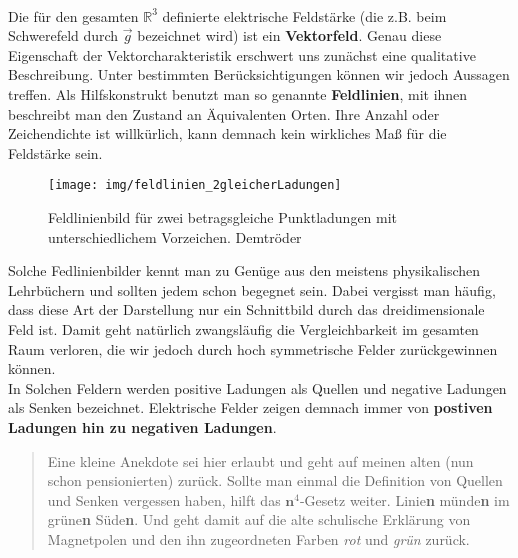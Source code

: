 \paragraph{} Die für den gesamten $\mathds{R}^3$ definierte elektrische Feldstärke (die z.B. beim Schwerefeld durch $\vec{g}$ bezeichnet wird) ist ein \textbf{Vektorfeld}. Genau diese Eigenschaft der Vektorcharakteristik erschwert uns zunächst eine qualitative Beschreibung. Unter bestimmten Berücksichtigungen können wir jedoch Aussagen treffen. Als Hilfskonstrukt benutzt man so genannte \textbf{Feldlinien}, mit ihnen beschreibt man den Zustand an Äquivalenten Orten. Ihre Anzahl oder Zeichendichte ist willkürlich, kann demnach kein wirkliches Maß für die Feldstärke sein.
\begin{figure}[h]
\texttt{[image: img/feldlinien\_2gleicherLadungen]}
\caption{Feldlinienbild für zwei betragsgleiche Punktladungen mit unterschiedlichem Vorzeichen. Demtröder}
\label{pic:Fedlinien-2gegenpolig}
\end{figure}
Solche Fedlinienbilder kennt man zu Genüge aus den meistens physikalischen Lehrbüchern und sollten jedem schon begegnet sein. Dabei vergisst man häufig, dass diese Art der Darstellung nur ein Schnittbild durch das dreidimensionale Feld ist. Damit geht natürlich zwangsläufig die Vergleichbarkeit im gesamten Raum verloren, die wir jedoch durch hoch symmetrische Felder zurückgewinnen können.\\ In Solchen Feldern werden positive Ladungen als Quellen und negative Ladungen als Senken bezeichnet. Elektrische Felder zeigen demnach immer von \textbf{postiven Ladungen hin zu negativen Ladungen}. \begin{quotation}Eine kleine Anekdote sei hier erlaubt und geht auf meinen alten (nun schon pensionierten) zurück. Sollte man einmal die Definition von Quellen und Senken vergessen haben, hilft das $\textbf{n}^4$-Gesetz weiter. Linie\textbf{n} münde\textbf{n} im grüne\textbf{n} Süde\textbf{n}. Und geht damit auf die alte schulische Erklärung von Magnetpolen und den ihn zugeordneten Farben \textit{rot} und \textit{grün} zurück.
\end{quotation}

